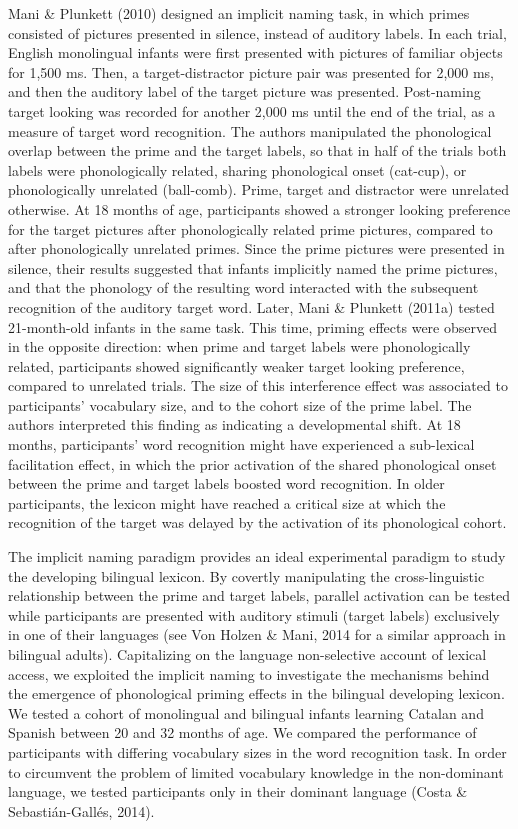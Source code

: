 \documentclass[
  12pt,
  b5paperpaper,
  twoside]{scrreprt}
\begin{document}
Mani \& Plunkett (2010) designed an implicit naming task, in which
primes consisted of pictures presented in silence, instead of auditory
labels. In each trial, English monolingual infants were first presented
with pictures of familiar objects for 1,500 ms. Then, a
target-distractor picture pair was presented for 2,000 ms, and then the
auditory label of the target picture was presented. Post-naming target
looking was recorded for another 2,000 ms until the end of the trial, as
a measure of target word recognition. The authors manipulated the
phonological overlap between the prime and the target labels, so that in
half of the trials both labels were phonologically related, sharing
phonological onset (cat-cup), or phonologically unrelated (ball-comb).
Prime, target and distractor were unrelated otherwise. At 18 months of
age, participants showed a stronger looking preference for the target
pictures after phonologically related prime pictures, compared to after
phonologically unrelated primes. Since the prime pictures were presented
in silence, their results suggested that infants implicitly named the
prime pictures, and that the phonology of the resulting word interacted
with the subsequent recognition of the auditory target word. Later, Mani
\& Plunkett (2011a) tested 21-month-old infants in the same task. This
time, priming effects were observed in the opposite direction: when
prime and target labels were phonologically related, participants showed
significantly weaker target looking preference, compared to unrelated
trials. The size of this interference effect was associated to
participants' vocabulary size, and to the cohort size of the prime
label. The authors interpreted this finding as indicating a
developmental shift. At 18 months, participants' word recognition might
have experienced a sub-lexical facilitation effect, in which the prior
activation of the shared phonological onset between the prime and target
labels boosted word recognition. In older participants, the lexicon
might have reached a critical size at which the recognition of the
target was delayed by the activation of its phonological cohort.

The implicit naming paradigm provides an ideal experimental paradigm to
study the developing bilingual lexicon. By covertly manipulating the
cross-linguistic relationship between the prime and target labels,
parallel activation can be tested while participants are presented with
auditory stimuli (target labels) exclusively in one of their languages
(see Von Holzen \& Mani, 2014 for a similar approach in bilingual
adults). Capitalizing on the language non-selective account of lexical
access, we exploited the implicit naming to investigate the mechanisms
behind the emergence of phonological priming effects in the bilingual
developing lexicon. We tested a cohort of monolingual and bilingual
infants learning Catalan and Spanish between 20 and 32 months of age. We
compared the performance of participants with differing vocabulary sizes
in the word recognition task. In order to circumvent the problem of
limited vocabulary knowledge in the non-dominant language, we tested
participants only in their dominant language (Costa \& Sebastián-Gallés,
2014).
\end{document}
